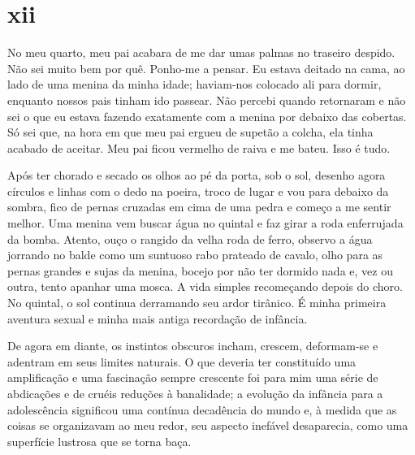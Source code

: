 \section{xii} 

 


No meu quarto, meu pai acabara de me dar umas palmas no traseiro despido. Não
sei muito bem por quê. Ponho-me a pensar. Eu estava deitado na cama, ao lado
de uma menina da minha idade; haviam-nos colocado ali para dormir, enquanto
nossos pais tinham ido passear. Não percebi quando retornaram e não sei o que
eu estava fazendo exatamente com a menina por debaixo das cobertas. Só sei
que, na hora em que meu pai ergueu de supetão a colcha, ela tinha acabado de
aceitar. Meu pai ficou vermelho de raiva e me bateu. Isso é tudo.

Após ter chorado e secado os olhos ao pé da porta, sob o sol, desenho agora
círculos e linhas com o dedo na poeira, troco de lugar e vou para debaixo da
sombra, fico de pernas cruzadas em cima de uma pedra e começo a me sentir
melhor. Uma menina vem buscar água no quintal e faz girar a roda enferrujada
da bomba. Atento, ouço o rangido da velha roda de ferro, observo a água
jorrando no balde como um suntuoso rabo prateado de cavalo, olho para as
pernas grandes e sujas da menina, bocejo por não ter dormido nada e, vez ou
outra, tento apanhar uma mosca. A vida simples recomeçando depois do choro.
No quintal, o sol continua derramando seu ardor tirânico. É minha primeira
aventura sexual e minha mais antiga recordação de infância.

De agora em diante, os instintos obscuros incham, crescem, deformam-se e
adentram em seus limites naturais. O que deveria ter constituído uma
amplificação e uma fascinação sempre crescente foi para mim uma série de
abdicações e de cruéis reduções à banalidade; a evolução da infância para a
adolescência significou uma contínua decadência do mundo e, à medida que as
coisas se organizavam ao meu redor, seu aspecto inefável desaparecia, como
uma superfície lustrosa que se torna baça.

